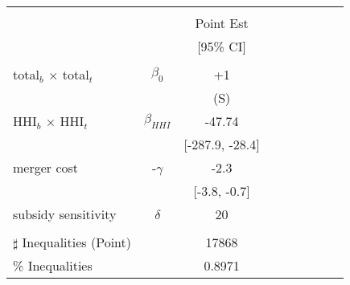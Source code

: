 \begin{tabular}{@{\extracolsep{5pt}}lcc}
\toprule 
 &  &  \\
 &  & Point Est \\
 &  & [95\% CI] \\
\midrule 
 &  &  \\
total$_{b}$ $\times$ total$_{t}$ & $\beta_0$ & +1 \\
 &  & (S) \\
HHI$_{b}$ $\times$ HHI$_{t}$ & $\beta_{HHI}$ & -47.74 \\
 &  & [-287.9, -28.4] &  &  &  &  &  &  &  \\
merger cost & -$\gamma$ & -2.3 \\
 &  & [-3.8, -0.7] \\
subsidy sensitivity & $\delta$ & 20 \\
 &  &  &  &  &  &  &  &  &  \\
\hline 
$\sharp$ Inequalities (Point) &  & 17868 \\
\% Inequalities &  & 0.8971 \\
\bottomrule 
\end{tabular}
